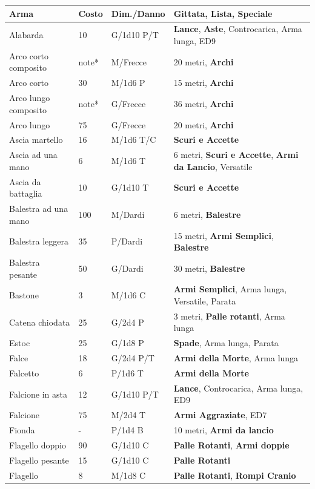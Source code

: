 \noindent\begin{xltabular}{1\textwidth}{lllX}
\textbf{Arma}&\textbf{Costo}&\textbf{Dim./Danno} & \textbf{Gittata, Lista, Speciale}\\
\hline
Alabarda& 10 & G/1d10 P/T& \textbf{Lance}, \textbf{Aste}, Controcarica, Arma lunga, ED9 \\
Arco corto composito& note*& M/Frecce& 20 metri, \textbf{Archi}\\
Arco corto& 30 & M/1d6 P& 15 metri, \textbf{Archi}\\
Arco lungo composito& note*& G/Frecce& 36 metri, \textbf{Archi}\\
Arco lungo& 75 & G/Frecce& 20 metri, \textbf{Archi}\\
Ascia martello& 16 & M/1d6 T/C& \textbf{Scuri e Accette}\\
Ascia ad una mano& 6 & M/1d6 T& 6 metri, \textbf{Scuri e Accette}, \textbf{Armi da Lancio}, Versatile\\
Ascia da battaglia& 10 & G/1d10 T&\textbf{Scuri e Accette}\\
Balestra ad una mano& 100& M/Dardi& 6 metri, \textbf{Balestre}\\
Balestra leggera& 35 & P/Dardi& 15 metri, \textbf{Armi Semplici}, \textbf{Balestre}\\
Balestra pesante& 50 & G/Dardi& 30 metri, \textbf{Balestre}\\
Bastone& 3& M/1d6 C& \textbf{Armi Semplici}, Arma lunga, Versatile, Parata\\
Catena chiodata& 25 & G/2d4 P& 3 metri, \textbf{Palle rotanti}, Arma lunga\\
Estoc& 25& G/1d8 P& \textbf{Spade}, Arma lunga, Parata\\
Falce& 18 & G/2d4 P/T& \textbf{Armi della Morte}, Arma lunga\\
Falcetto& 6& P/1d6 T& \textbf{Armi della Morte}\\
Falcione in asta& 12 & G/1d10 P/T& \textbf{Lance}, Controcarica, Arma lunga, ED9\\
Falcione& 75 & M/2d4 T& \textbf{Armi Aggraziate}, ED7\\
Fionda& -& P/1d4 B& 10 metri, \textbf{Armi da lancio}\\
Flagello doppio& 90 & G/1d10 C& \textbf{Palle Rotanti}, \textbf{Armi doppie}\\
Flagello pesante& 15 & G/1d10 C& \textbf{Palle Rotanti}\\
Flagello& 8& M/1d8 C& \textbf{Palle Rotanti}, \textbf{Rompi Cranio}\\

\end{xltabular}
